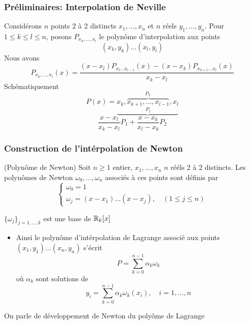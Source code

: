 \subsubsection{Préliminaires: Interpolation de Neville}
\begin{lemma}
   Considérons $n$ points 2 à 2 distincts $x_1, \ldots, x_n$ et $n$ réels  $y_1, \ldots, y_n$. Pour $1 \le k \le l \le n$, posons $P_{x_k, \ldots, x_l}$ le polynôme d'interpolation aux points 
   \[
       (x_k, y_k) \ldots (x_l, y_l)
   \] 
   Nous avons
   \[
       P_{x_k, \ldots, x_l}(x) = \frac{(x - x_l)P_{x_l \ldots x_{l - 1}}(x) - (x - x_k)P_{x_{k+1}\ldots x_l}(x)}{x_k - x_l}
   \] 
   Schématiquement
   \[
       P(x) = \underbrace{x_k, \overbrace{x_{k+1}, \ldots, x_{l-1}}_{P_1}, x_l}^{P_2}
   \] 
   \[
   \frac{x - x_l}{x_k - x_l}P_1 + \frac{x - x_k}{x_l - x_k}P_2
   \] 
\end{lemma}

\subsubsection{Construction de l'intérpolation de Newton}
\begin{definition} (Polynôme de Newton)
    Soit $n \ge 1$ entier, $x_1, \ldots, x_n$ $n$ rééls 2 à 2 distincts. Les polynômes de Newton  $\omega_0, \ldots, \omega_n$ associés à ces points sont définis par
    \[
    \begin{cases}
        \omega_0 = 1\\
        \omega_j = (x - x_1) \ldots (x - x_j), \quad (1 \le j \le n)
    \end{cases}
    \] 
\end{definition}
\begin{remark}
    $\{\omega_j\}_{j = 1, \ldots, k}$ est une base de $\mathbb{R}_k[x]$    
    \begin{itemize}
        \item Ainsi le polynôme d'intérpolation de Lagrange associé aux points $(x_1, y_1) \ldots (x_n, y_n)$ s'écrit
            \[
            P = \sum_{k=0}^{n-1} \alpha_k\omega_k
            \] 
            où $\alpha_k$ sont solutions de 
             \[
            y_i = \sum_{k=0}^{n-1} \alpha_k\omega_k(x_i), \quad i = 1, \ldots, n
            \] 
    \end{itemize}
\end{remark}
On parle de développement de Newton du polyôme de Lagrange

